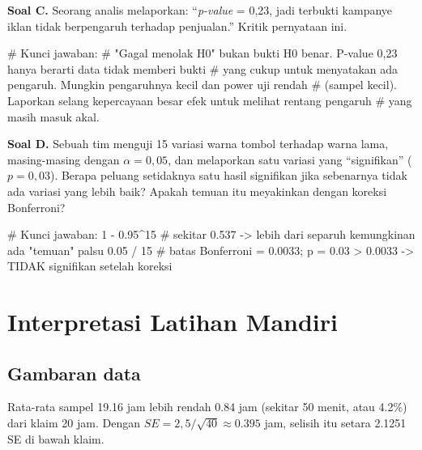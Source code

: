 \documentclass[
  indonesian,
  letterpaper,
]{book}
\newenvironment{Shaded}{\begin{snugshade}}{\end{snugshade}}
\newcommand{\CommentTok}[1]{\textcolor[rgb]{0.37,0.37,0.37}{#1}}
\newcommand{\DecValTok}[1]{\textcolor[rgb]{0.68,0.00,0.00}{#1}}
\newcommand{\FloatTok}[1]{\textcolor[rgb]{0.68,0.00,0.00}{#1}}
\newcommand{\SpecialCharTok}[1]{\textcolor[rgb]{0.37,0.37,0.37}{#1}}
\begin{document}
\textbf{Soal C.} Seorang analis melaporkan: ``\emph{p-value} = 0,23,
jadi terbukti kampanye iklan tidak berpengaruh terhadap penjualan.''
Kritik pernyataan ini.

\begin{Shaded}
\begin{Highlighting}[]
\CommentTok{\# Kunci jawaban:}
\CommentTok{\# "Gagal menolak H0" bukan bukti H0 benar. P{-}value 0,23 hanya berarti data tidak memberi bukti}
\CommentTok{\# yang cukup untuk menyatakan ada pengaruh. Mungkin pengaruhnya kecil dan power uji rendah}
\CommentTok{\# (sampel kecil). Laporkan selang kepercayaan besar efek untuk melihat rentang pengaruh}
\CommentTok{\# yang masih masuk akal.}
\end{Highlighting}
\end{Shaded}

\textbf{Soal D.} Sebuah tim menguji 15 variasi warna tombol terhadap
warna lama, masing-masing dengan \(\alpha = 0{,}05\), dan melaporkan
satu variasi yang ``signifikan'' (\(p = 0{,}03\)). Berapa peluang
setidaknya satu hasil signifikan jika sebenarnya tidak ada variasi yang
lebih baik? Apakah temuan itu meyakinkan dengan koreksi Bonferroni?

\begin{Shaded}
\begin{Highlighting}[]
\CommentTok{\# Kunci jawaban:}
\DecValTok{1} \SpecialCharTok{{-}} \FloatTok{0.95}\SpecialCharTok{\^{}}\DecValTok{15}   \CommentTok{\# sekitar 0.537 {-}\textgreater{} lebih dari separuh kemungkinan ada "temuan" palsu}
\FloatTok{0.05} \SpecialCharTok{/} \DecValTok{15}     \CommentTok{\# batas Bonferroni = 0.0033; p = 0.03 \textgreater{} 0.0033 {-}\textgreater{} TIDAK signifikan setelah koreksi}
\end{Highlighting}
\end{Shaded}

\section{Interpretasi Latihan
Mandiri}\label{interpretasi-latihan-mandiri}

\subsection{Gambaran data}\label{gambaran-data}

Rata-rata sampel 19.16 jam lebih rendah 0.84 jam (sekitar 50 menit, atau
4.2\%) dari klaim 20 jam. Dengan \(SE = 2{,}5/\sqrt{40} \approx 0.395\)
jam, selisih itu setara 2.1251 SE di bawah klaim.
\end{document}
